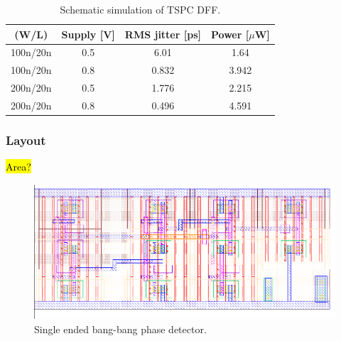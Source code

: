 		\begin{table}[h!]
			\centering
			\def\arraystretch{1.5}		
			\setlength\arrayrulewidth{0.75pt}
			\setlength{\tabcolsep}{1em} %
			\begin{tabular}{|c|c|c|c|}
				\hline 
				\rule[-1ex]{0pt}{2.5ex} \cellcolor{gray!40}\textbf{(W/L)} & \cellcolor{gray!40}\textbf{Supply [V]} & \cellcolor{gray!40}\textbf{RMS jitter [ps]}& \cellcolor{gray!40}\textbf{Power [$\mu$W]}\\ 
				\hline 
				\rule[-1ex]{0pt}{2.5ex} 100n/20n  & 0.5 & 6.01 & 1.64\\ 
				\hline 
				\rule[-1ex]{0pt}{2.5ex} 100n/20n  & 0.8 & 0.832  & 3.942\\ 
				\hline 
				\rule[-1ex]{0pt}{2.5ex} 200n/20n  & 0.5 & 1.776 & 2.215 \\ 
				\hline 
				\rule[-1ex]{0pt}{2.5ex} 200n/20n  & 0.8 & 0.496  & 4.591 \\ 
				\hline 
			\end{tabular} 
			\caption{Schematic simulation of TSPC DFF.}
			\label{tab:dff}
		\end{table}   







		\FloatBarrier
		\subsubsection{Layout}
			\hl{Area?}
			\begin{figure}[htb!]
			        \centering
			        \includegraphics[width=\textwidth, angle=0]{./figs/layout/layout_bbpd}
			    \caption{Single ended bang-bang phase detector.}
			\end{figure}



